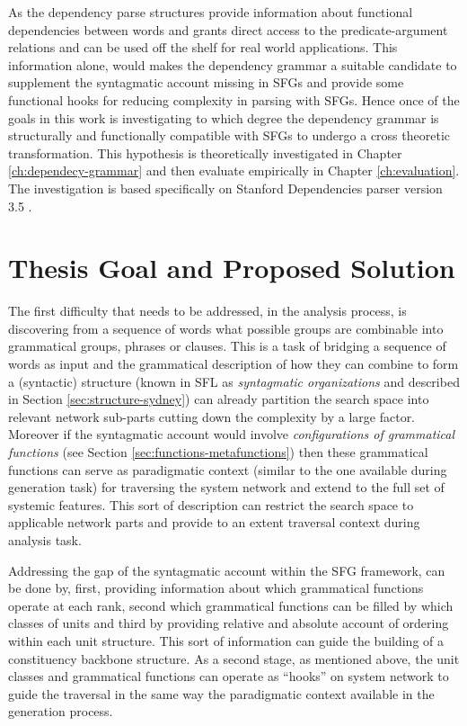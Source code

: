 As the dependency parse structures provide information about functional dependencies between words and grants direct access to the predicate-argument relations and can be used off the shelf for real world applications. 
This information alone, would makes the dependency grammar a suitable candidate to supplement the syntagmatic account missing in SFGs and provide some functional hooks for reducing complexity in parsing with SFGs. Hence once of the goals in this work is investigating to which degree the dependency grammar is structurally and functionally compatible with SFGs to undergo a cross theoretic transformation. This hypothesis is theoretically investigated in Chapter \ref{ch:dependecy-grammar} and then evaluate empirically in Chapter \ref{ch:evaluation}. The investigation is based specifically on Stanford Dependencies parser version 3.5 \citep{Marneffe2008a,Marneffe2008, Marneffe2014}. 


\section{Thesis Goal and Proposed Solution}


The first difficulty that needs to be addressed, in the analysis process, is discovering from a sequence of words what possible groups are combinable into grammatical groups, phrases or clauses. This is a task of bridging a sequence of words as input and the grammatical description of how they can combine to form a (syntactic) structure (known in SFL as \textit{syntagmatic organizations} and described in Section \ref{sec:structure-sydney}) can already partition the search space into relevant network sub-parts cutting down the complexity by a large factor. Moreover if the syntagmatic account would involve \textit{configurations of grammatical functions} (see Section \ref{sec:functions-metafunctions}) then these grammatical functions can serve as paradigmatic context (similar to the one available during generation task) for traversing the system network and extend to the full set of systemic features. This sort of description can restrict the search space to applicable network parts and provide to an extent traversal context during analysis task.

Addressing the gap of the syntagmatic account within the SFG framework, can be done by, first, providing information about which grammatical functions operate at each rank, second which grammatical functions can be filled by which classes of units and third by providing relative and absolute account of ordering within each unit structure. This sort of information can guide the building of a constituency backbone structure. As a second stage, as mentioned above, the unit classes and grammatical functions can operate as ``hooks'' on system network to guide the traversal in the same way the paradigmatic context available in the generation process. 

